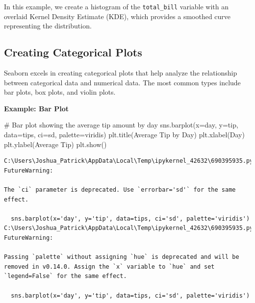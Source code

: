\documentclass[
  letterpaper,
  DIV=11,
  numbers=noendperiod]{scrreprt}
\newenvironment{Shaded}{\begin{snugshade}}{\end{snugshade}}
\newcommand{\CommentTok}[1]{\textcolor[rgb]{0.37,0.37,0.37}{#1}}
\newcommand{\NormalTok}[1]{\textcolor[rgb]{0.00,0.23,0.31}{#1}}
\newcommand{\OperatorTok}[1]{\textcolor[rgb]{0.37,0.37,0.37}{#1}}
\newcommand{\StringTok}[1]{\textcolor[rgb]{0.13,0.47,0.30}{#1}}
\begin{document}
In this example, we create a histogram of the \texttt{total\_bill}
variable with an overlaid Kernel Density Estimate (KDE), which provides
a smoothed curve representing the distribution.

\hypertarget{creating-categorical-plots}{%
\subsection{Creating Categorical
Plots}\label{creating-categorical-plots}}

Seaborn excels in creating categorical plots that help analyze the
relationship between categorical data and numerical data. The most
common types include bar plots, box plots, and violin plots.

\textbf{Example: Bar Plot}

\begin{Shaded}
\begin{Highlighting}[]
\CommentTok{\# Bar plot showing the average tip amount by day}
\NormalTok{sns.barplot(x}\OperatorTok{=}\StringTok{\textquotesingle{}day\textquotesingle{}}\NormalTok{, y}\OperatorTok{=}\StringTok{\textquotesingle{}tip\textquotesingle{}}\NormalTok{, data}\OperatorTok{=}\NormalTok{tips, ci}\OperatorTok{=}\StringTok{\textquotesingle{}sd\textquotesingle{}}\NormalTok{, palette}\OperatorTok{=}\StringTok{\textquotesingle{}viridis\textquotesingle{}}\NormalTok{)}
\NormalTok{plt.title(}\StringTok{\textquotesingle{}Average Tip by Day\textquotesingle{}}\NormalTok{)}
\NormalTok{plt.xlabel(}\StringTok{\textquotesingle{}Day\textquotesingle{}}\NormalTok{)}
\NormalTok{plt.ylabel(}\StringTok{\textquotesingle{}Average Tip\textquotesingle{}}\NormalTok{)}
\NormalTok{plt.show()}
\end{Highlighting}
\end{Shaded}

\begin{verbatim}
C:\Users\Joshua_Patrick\AppData\Local\Temp\ipykernel_42632\690395935.py:2: FutureWarning: 

The `ci` parameter is deprecated. Use `errorbar='sd'` for the same effect.

  sns.barplot(x='day', y='tip', data=tips, ci='sd', palette='viridis')
C:\Users\Joshua_Patrick\AppData\Local\Temp\ipykernel_42632\690395935.py:2: FutureWarning: 

Passing `palette` without assigning `hue` is deprecated and will be removed in v0.14.0. Assign the `x` variable to `hue` and set `legend=False` for the same effect.

  sns.barplot(x='day', y='tip', data=tips, ci='sd', palette='viridis')
\end{verbatim}
\end{document}

